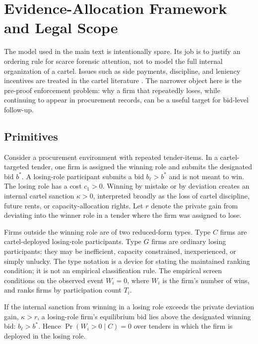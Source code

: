 \section{Evidence-Allocation Framework and Legal Scope}
\label{app:framework_submission}

The model used in the main text is intentionally spare. Its job
is to justify an ordering rule for scarce forensic attention,
not to model the full internal organization of a cartel. Issues
such as side payments, discipline, and leniency incentives are
treated in the cartel literature
\citep{asker2010leniency,marshall2012economics}. The narrower
object here is the pre-proof enforcement problem: why a firm
that repeatedly loses, while continuing to appear in procurement
records, can be a useful target for bid-level follow-up.

\subsection{Primitives}
\label{app:framework_primitives}

Consider a procurement environment with repeated tender-items.
In a cartel-targeted tender, one firm is assigned the winning
role and submits the designated bid $b^*$. A losing-role
participant submits a bid $b_\ell>b^*$ and is not meant to win.
The losing role has a cost $c_1>0$. Winning by mistake or by
deviation creates an internal cartel sanction $\kappa>0$,
interpreted broadly as the loss of cartel discipline, future
rents, or capacity-allocation rights. Let $r$ denote the private
gain from deviating into the winner role in a tender where the
firm was assigned to lose.

Firms outside the winning role are of two reduced-form types.
Type $C$ firms are cartel-deployed losing-role participants. Type
$G$ firms are ordinary losing participants: they may be
inefficient, capacity constrained, inexperienced, or simply
unlucky. The type notation is a device for stating the maintained
ranking condition; it is not an empirical classification rule.
The empirical screen conditions on the observed event
$W_i=0$, where $W_i$ is the firm's number of wins, and ranks
firms by participation count $T_i$.

\begin{lemma}
\label{lem:submission_zero_win}
If the internal sanction from winning in a losing role exceeds
the private deviation gain, $\kappa>r$, a losing-role firm's
equilibrium bid lies above the designated winning bid:
$b_\ell>b^*$. Hence $\Pr(W_i>0\mid C)=0$ over tenders in which
the firm is deployed in the losing role.
\end{lemma}

